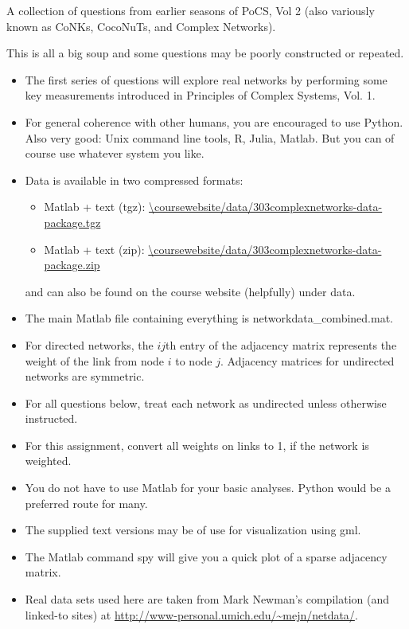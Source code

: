 A collection of questions from earlier
seasons of
PoCS, Vol 2 (also variously known as CoNKs, CocoNuTs, and Complex Networks).

This is all a big soup and some questions may be poorly constructed or repeated.



\begin{itemize}
\item 
  The first series of questions will explore real networks
  by performing some key measurements introduced
  in Principles of Complex Systems, Vol. 1.
\item
  For general coherence with other humans, you are encouraged to use Python.
  Also very good: Unix command line tools, R, Julia, Matlab.
  But you can of course use whatever system you like.
\item
  Data is available in two compressed formats:
  \begin{itemize}
  \item 
    Matlab + text (tgz): \url{\coursewebsite/data/303complexnetworks-data-package.tgz}
  \item 
    Matlab + text (zip): \url{\coursewebsite/data/303complexnetworks-data-package.zip}
  \end{itemize}
  and can also be found on the course website (helpfully) under data.
\item
  The main Matlab file containing everything is networkdata\_{c}ombined.mat.
\item
  For directed networks, the $ij$th entry of the adjacency matrix
  represents the weight of the link from node $i$ to node $j$.
  Adjacency matrices for undirected networks are symmetric.
\item
  For all questions below, 
  treat each network as undirected unless otherwise instructed.
\item
  For this assignment, convert all weights on
  links to 1, if the network is weighted.
\item 
  You do not have to use Matlab for your basic
  analyses.
  Python would be a preferred route for many.
\item 
  The supplied text versions may be of
  use for visualization using gml.
\item
  The Matlab command spy will give you a quick plot
  of a sparse adjacency matrix.
\item
  Real data sets used here are taken
  from Mark Newman's compilation (and linked-to sites) at
  \url{http://www-personal.umich.edu/~mejn/netdata/}.
\end{itemize}

